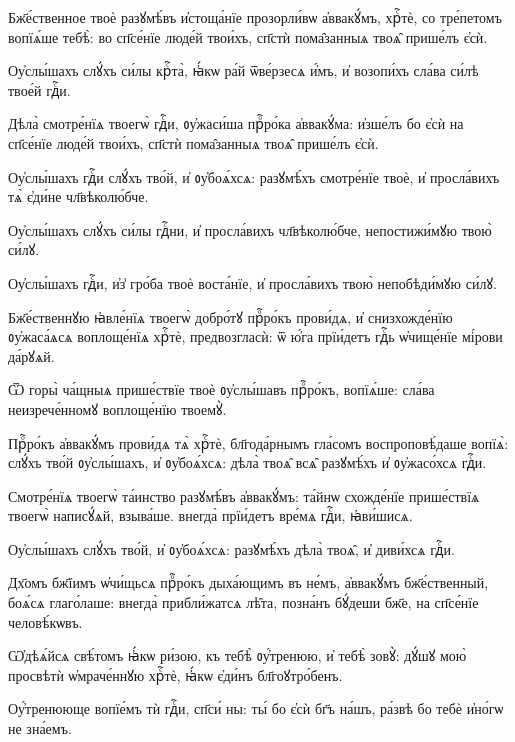 \hKv Бж҃е́ственное твоѐ разꙋмѣ́въ и҆стоща́нїе прозорли́вѡ  а҆ввакꙋ́мъ, хрⷭ҇тѐ, со тре́петомъ вопїѧ́ше тебѣ̀: во  сп҃се́нїе люде́й твои́хъ, сп҃стѝ пома̑занныѧ твоѧ̑ прише́лъ  є҆сѝ. 
%

\hKv Оу҆слы́шахъ слꙋ́хъ си́лы крⷭ҇та̀, ꙗ҆́кѡ  ра́й ѿве́рзесѧ и҆́мъ, и҆ возопи́хъ сла́ва си́лѣ твое́й  гдⷭ҇и. 
%

\hKv Дѣла̀ смотре́нїѧ твоегѡ̀ гдⷭ҇и, ᲂу҆жаси́ша прⷪ҇ро́ка  а҆ввакꙋ́ма: и҆зше́лъ бо є҆сѝ на сп҃се́нїе  люде́й твои́хъ, сп҃стѝ пома̑занныѧ твоѧ̑ прише́лъ  є҆сѝ. 

\hKv Оу҆слы́шахъ гдⷭ҇и слꙋ́хъ тво́й, и҆ ᲂу҆боѧ́хсѧ: разꙋмѣ́хъ  смотре́нїе твоѐ, и҆ просла́вихъ тѧ̀ є҆ди́не  чл҃вѣколю́бче. 

\hKv Оу҆слы́шахъ слꙋ́хъ си́лы гдⷭ҇ни, и҆ просла́вихъ  чл҃вѣколю́бче, непостижи́мꙋю твою̀ си́лꙋ. 

\hKv Оу҆слы́шахъ гдⷭ҇и, и҆з̾ гро́ба твоѐ воста́нїе, и҆  просла́вихъ твою̀ непобѣди́мꙋю си́лꙋ. 

\hKv Бж҃е́ственнꙋю ꙗ҆вле́нїѧ твоегѡ̀ добро́тꙋ прⷪ҇ро́къ  прови́дѧ, и҆ снизхожде́нїю ᲂу҆жаса́ѧсѧ воплоще́нїѧ хрⷭ҇тѐ,  предвозгласѝ: ѿ ю҆́га прїи́детъ гдⷭ҇ь ѡ҆чище́нїе мі́рови  да́рꙋѧй.  

\hKv Ѿ горы̀ ча́щныѧ прише́ствїе твоѐ ᲂу҆слы́шавъ прⷪ҇ро́къ,  вопїѧ́ше: сла́ва неизрече́нномꙋ воплоще́нїю твоемꙋ̀. 

\hKv Прⷪ҇ро́къ а҆ввакꙋ́мъ прови́дѧ тѧ̀ хрⷭ҇тѐ, бл҃года́рнымъ  гла́сомъ воспроповѣ́даше вопїѧ̀: слꙋ́хъ тво́й ᲂу҆слы́шахъ,  и҆ ᲂу҆боѧ́хсѧ: дѣла̀ твоѧ̑ всѧ̑ разꙋмѣ́хъ и҆ ᲂу҆жасо́хсѧ  гдⷭ҇и.  

\hKv Смотре́нїѧ твоегѡ̀ та́инство разꙋмѣ́въ а҆ввакꙋ́мъ: та́йнѡ  схожде́нїе прише́ствїѧ твоегѡ̀ написꙋ́ѧй, взыва́ше. внегда̀  прїи́детъ вре́мѧ гдⷭ҇и, ꙗ҆ви́шисѧ. 

\hKv Оу҆слы́шахъ слꙋ́хъ тво́й, и҆ ᲂу҆боѧ́хсѧ: разꙋмѣ́хъ дѣла̀  твоѧ̑, и҆ диви́хсѧ гдⷭ҇и. 

\hKv Дх҃омъ бж҃їимъ ѡ҆чи́щьсѧ прⷪ҇ро́къ дыха́ющимъ въ не́мъ,  а҆ввакꙋ́мъ бж҃е́ственный, боѧ́сѧ глаго́лаше: внегда̀  прибли́жатсѧ лѣ̑та, позна́нъ бꙋ́деши бж҃е, на сп҃се́нїе  человѣ́кѡвъ. 
%

\hKv Ѡ҆дѣѧ́йсѧ свѣ́томъ ꙗ҆́кѡ ри́зою, къ тебѣ̀ ᲂу҆́тренюю,  и҆ тебѣ̀ зовꙋ̀: дꙋ́шꙋ мою̀ просвѣтѝ ѡ҆мраче́ннꙋю хрⷭ҇тѐ,  ꙗ҆́кѡ є҆ди́нъ бл҃гоꙋтро́бенъ. 
%

\hKv Оу҆́тренююще вопїе́мъ тѝ гдⷭ҇и, сп҃си́ ны:  ты́ бо є҆сѝ бг҃ъ на́шъ, ра́звѣ бо тебѐ и҆но́гѡ не  зна́емъ.  
%

